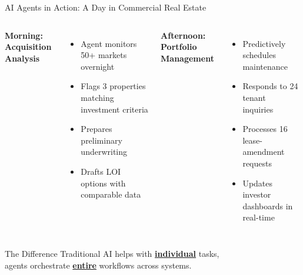 \documentclass{beamer}
\begin{document}
\begin{frame}{AI Agents in Action: A Day in Commercial Real Estate}
\small
  \begin{columns}
      \textbf{Morning: Acquisition Analysis}
      \begin{itemize}\small
        \item Agent monitors 50+ markets overnight
        \item Flags 3 properties matching investment criteria
        \item Prepares preliminary underwriting
        \item Drafts LOI options with comparable data
      \end{itemize}
      \textbf{Afternoon: Portfolio Management}
      \begin{itemize}\small
        \item Predictively schedules maintenance
        \item Responds to 24 tenant \\ inquiries
        \item Processes 16 lease-amendment requests
        \item Updates investor dashboards in real-time
      \end{itemize}
  \end{columns}

  \vspace{0.3cm}
  \begin{block}{The Difference}
    \centering Traditional AI helps with \underline{\textbf{individual}} tasks,\\
    agents orchestrate \underline{\textbf{entire}} workflows across systems.
  \end{block}
\end{frame}

\end{document}
